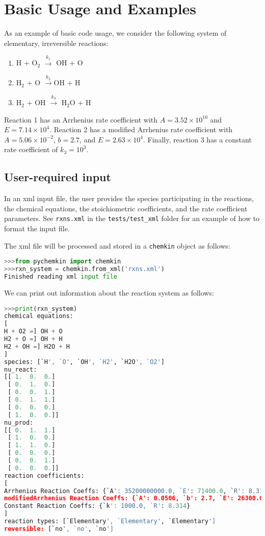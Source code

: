 \documentclass[12pt]{article}
\begin{document}
\section{Basic Usage and Examples}
As an example of basic code usage, we consider the following system of elementary, irreversible reactions:

\begin{enumerate}
\item H + O$_2$ $\overset{k_1}{\rightarrow}$ OH + O
\item H$_2$ + O $\overset{k_2}{\rightarrow}$OH + H
\item H$_2$ + OH $\overset{k_3}{\rightarrow}$ H$_2$O + H
\end{enumerate}

Reaction 1 has an Arrhenius rate coefficient with $A = 3.52\times 10^{10}$ and $E = 7.14\times 10^4$. Reaction 2 has a modified Arrhenius rate coefficient with $A = 5.06\times 10^{-2}$, $b = 2.7$, and $E = 2.63\times10^4$. Finally, reaction 3 has a constant rate coefficient of $k_3 = 10^3$.



\subsection{User-required input}
In an xml input file, the user provides the species participating in the reactions, the chemical equations, the stoichiometric coefficients, and the rate coefficient parameters. See {\tt rxns.xml} in the {\tt tests/test\_xml} folder for an example of how to format the input file. 

The xml file will be processed and stored in a {\tt chemkin} object as follows:
\begin{lstlisting}[language = Python, basicstyle = \ttfamily, breaklines = True, columns = fullflexible]
>>>from pychemkin import chemkin
>>>rxn_system = chemkin.from_xml('rxns.xml')
Finished reading xml input file
\end{lstlisting}

We can print out information about the reaction system as follows:
\begin{lstlisting}[language = Python, basicstyle = \ttfamily,columns = fullflexible, showstringspaces = False]
>>>print(rxn_system)
chemical equations:
[
H + O2 =] OH + O
H2 + O =] OH + H
H2 + OH =] H2O + H
]
species: [`H', `O', `OH', `H2', `H2O', `O2']
nu_react:
[[ 1.  0.  0.]
 [ 0.  1.  0.]
 [ 0.  0.  1.]
 [ 0.  1.  1.]
 [ 0.  0.  0.]
 [ 1.  0.  0.]]
nu_prod:
[[ 0.  1.  1.]
 [ 1.  0.  0.]
 [ 1.  1.  0.]
 [ 0.  0.  0.]
 [ 0.  0.  1.]
 [ 0.  0.  0.]]
reaction coefficients:
[
Arrhenius Reaction Coeffs: {`A': 35200000000.0, `E': 71400.0, `R': 8.314}
modifiedArrhenius Reaction Coeffs: {`A': 0.0506, `b': 2.7, `E': 26300.0, `R': 8.314}
Constant Reaction Coeffs: {`k': 1000.0, `R': 8.314}
]
reaction types: [`Elementary', `Elementary', `Elementary']
reversible: [`no', `no', `no']
\end{lstlisting}
\end{document}
